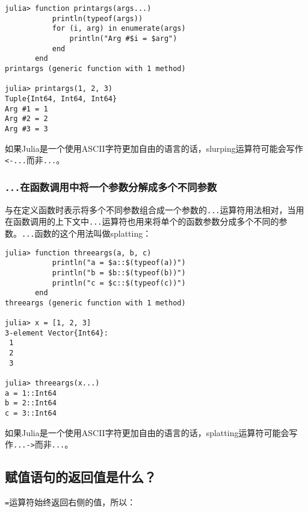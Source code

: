 \begin{verbatim}
julia> function printargs(args...)
           println(typeof(args))
           for (i, arg) in enumerate(args)
               println("Arg #$i = $arg")
           end
       end
printargs (generic function with 1 method)

julia> printargs(1, 2, 3)
Tuple{Int64, Int64, Int64}
Arg #1 = 1
Arg #2 = 2
Arg #3 = 3
\end{verbatim}



如果Julia是一个使用ASCII字符更加自由的语言的话，slurping运算符可能会写作\texttt{<-...}而非\texttt{...}。



\hypertarget{4752115827323838494}{}


\subsubsection{\texttt{...}在函数调用中将一个参数分解成多个不同参数}



与在定义函数时表示将多个不同参数组合成一个参数的\texttt{...}运算符用法相对，当用在函数调用的上下文中\texttt{...}运算符也用来将单个的函数参数分成多个不同的参数。\texttt{...}函数的这个用法叫做splatting：




\begin{verbatim}
julia> function threeargs(a, b, c)
           println("a = $a::$(typeof(a))")
           println("b = $b::$(typeof(b))")
           println("c = $c::$(typeof(c))")
       end
threeargs (generic function with 1 method)

julia> x = [1, 2, 3]
3-element Vector{Int64}:
 1
 2
 3

julia> threeargs(x...)
a = 1::Int64
b = 2::Int64
c = 3::Int64
\end{verbatim}



如果Julia是一个使用ASCII字符更加自由的语言的话，splatting运算符可能会写作\texttt{...->}而非\texttt{...}。



\hypertarget{18313029058103158138}{}


\subsection{赋值语句的返回值是什么？}



\texttt{=}运算符始终返回右侧的值，所以：




